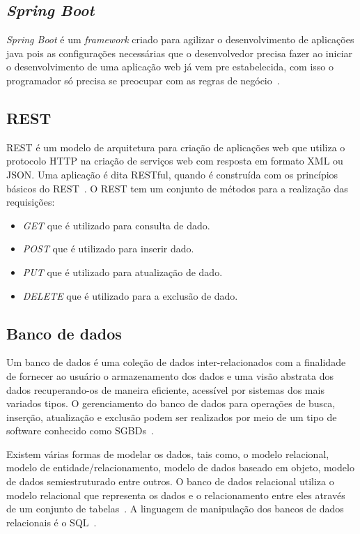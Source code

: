 \subsection{\textit{Spring Boot}}\label{spring}
\indent

\textit{Spring Boot} é um \textit{framework} criado para agilizar o desenvolvimento de aplicações java pois as configurações necessárias que o desenvolvedor precisa fazer ao iniciar o desenvolvimento de uma aplicação web já vem pre estabelecida, com isso o programador só precisa se preocupar com as regras de negócio~\citep{springboot}.

\subsection{REST}\label{rest}
\indent

\acf{REST} é um modelo de arquitetura para criação de aplicações web que utiliza o protocolo \acf{HTTP} na criação de serviços web com resposta em formato XML ou JSON. 
Uma aplicação é dita RESTful, quando é construída com os princípios básicos do REST~\citep{lecheta2015web}.
O REST tem um conjunto de métodos para a realização das requisições:

\begin{itemize}
    \item \textit{GET} que é utilizado para consulta de dado.
    \item \textit{POST} que é utilizado para inserir dado.
    \item \textit{PUT} que é utilizado para atualização de dado.
    \item \textit{DELETE} que é utilizado para a exclusão de dado.
\end{itemize}

\subsection{Banco de dados}\label{bd}
\indent

Um banco de dados é uma coleção de dados inter-relacionados com a finalidade de fornecer ao usuário o armazenamento dos dados e uma visão abstrata dos dados recuperando-os de maneira eficiente, acessível por sistemas dos mais variados tipos.
O gerenciamento do banco de dados para operações de busca, inserção, atualização e exclusão podem ser realizados por meio de um tipo de software conhecido como \acf{SGBDs}~\citep{silberschatz2016sistema}. 

Existem várias formas de modelar os dados, tais como, o modelo relacional, modelo de entidade/relacionamento, modelo de dados baseado em objeto, modelo de dados semiestruturado entre outros. 
O banco de dados relacional utiliza o modelo relacional que representa os dados e o relacionamento entre eles através de um conjunto de tabelas~\citep{silberschatz2016sistema}.
A linguagem de manipulação dos bancos de dados relacionais é o \acf{SQL}~\citep{silberschatz2016sistema}.

